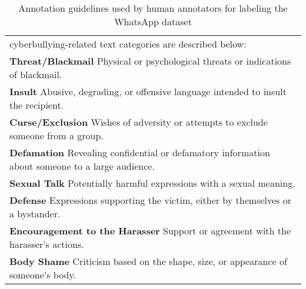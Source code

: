 \begin{table*}
    \centering
    \begin{tabularx}{\linewidth}{|X|}
        \hline
       cyberbullying-related text categories are described below:\\
       
    \textbf{Threat/Blackmail} Physical or psychological threats or indications of blackmail.\\
    \textbf{Insult}  Abusive, degrading, or offensive language intended to insult the recipient.\\
    \textbf{Curse/Exclusion}  Wishes of adversity or attempts to exclude someone from a group.\\
    \textbf{Defamation}  Revealing confidential or defamatory information about someone to a large audience.\\
    \textbf{Sexual Talk}  Potentially harmful expressions with a sexual meaning.\\
    \textbf{Defense}  Expressions supporting the victim, either by themselves or a bystander.\\
    \textbf{Encouragement to the Harasser}  Support or agreement with the harasser's actions.\\
    \textbf{Body Shame}  Criticism based on the shape, size, or appearance of someone's body. \\
        \hline
    \end{tabularx}
    \caption{Annotation guidelines used by human annotators for labeling the WhatsApp dataset}
    \label{t:whatsapp-guideline} 
\end{table*}




